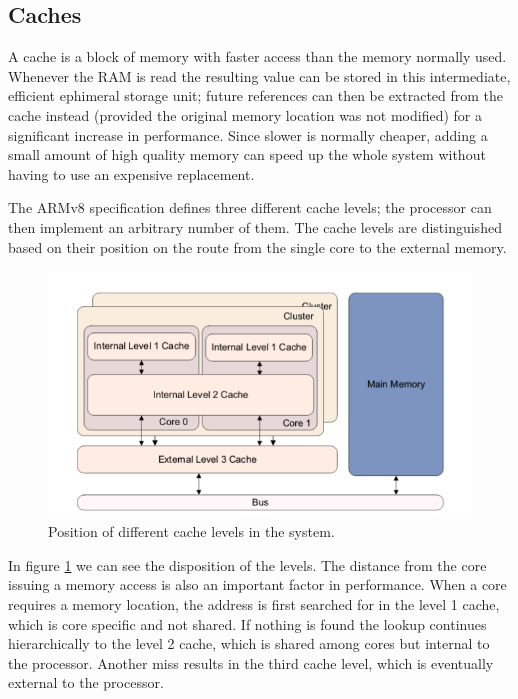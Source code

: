 \documentclass[12pt,a4paper,openright,twoside]{report}
\begin{document}
\subsection{Caches}
\label{cache}
A cache is a block of memory with faster access than the memory normally used.
Whenever the RAM is read the resulting value can be stored in this intermediate,
efficient ephimeral storage unit; future references can then be extracted from 
the cache instead (provided the original memory location was not modified) for
a significant increase in performance.
Since slower is normally cheaper, adding a small amount of high quality memory can
speed up the whole system without having to use an expensive replacement.

The ARMv8 specification defines three different cache levels; the processor can
then implement an arbitrary number of them. The cache levels are distinguished 
based on their position on the route from the single core to the external memory.

 \begin{figure}[t]
 \includegraphics[scale=0.6]{images/tesi12.png} 
 \caption[Cache levels]{Position of different cache levels in the system.}\label{fig:cache}
 \end{figure}

 In figure \ref{fig:cache} we can see the disposition of the levels. The distance
 from the core issuing a memory access is also an important factor in performance.
When a core requires a memory location, the address is first searched for in 
the level 1 cache, which is core specific and not shared. If nothing is found 
the lookup continues hierarchically to the level 2 cache, which is shared among
cores but internal to the processor. Another miss results in the third cache level,
which is eventually external to the processor.
\end{document}
